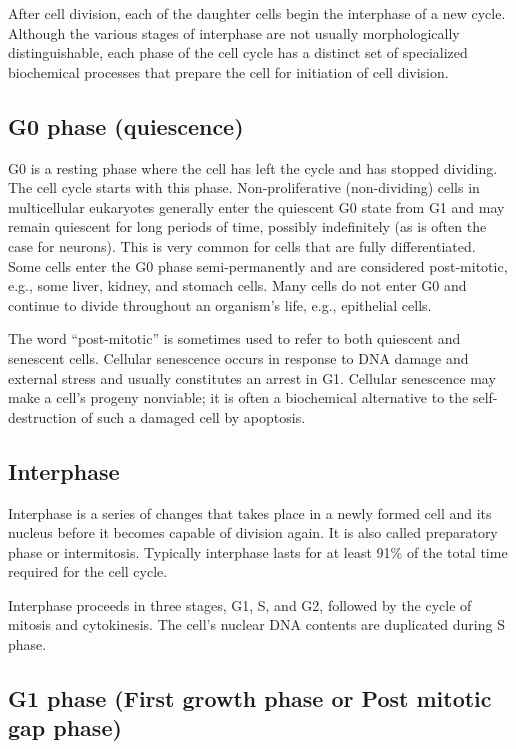 After cell division, each of the daughter cells begin the interphase of a new cycle. Although the various stages of interphase are not usually morphologically distinguishable, each phase of the cell cycle has a distinct set of specialized biochemical processes that prepare the cell for initiation of cell division.

\hypertarget{g0-phase-quiescence}{%
\subsection{G0 phase (quiescence)}\label{g0-phase-quiescence}}

G0 is a resting phase where the cell has left the cycle and has stopped dividing. The cell cycle starts with this phase. Non-proliferative (non-dividing) cells in multicellular eukaryotes generally enter the quiescent G0 state from G1 and may remain quiescent for long periods of time, possibly indefinitely (as is often the case for neurons). This is very common for cells that are fully differentiated. Some cells enter the G0 phase semi-permanently and are considered post-mitotic, e.g., some liver, kidney, and stomach cells. Many cells do not enter G0 and continue to divide throughout an organism's life, e.g., epithelial cells.

The word ``post-mitotic'' is sometimes used to refer to both quiescent and senescent cells. Cellular senescence occurs in response to DNA damage and external stress and usually constitutes an arrest in G1. Cellular senescence may make a cell's progeny nonviable; it is often a biochemical alternative to the self-destruction of such a damaged cell by apoptosis.

\hypertarget{interphase}{%
\subsection{Interphase}\label{interphase}}

Interphase is a series of changes that takes place in a newly formed cell and its nucleus before it becomes capable of division again. It is also called preparatory phase or intermitosis. Typically interphase lasts for at least 91\% of the total time required for the cell cycle.

Interphase proceeds in three stages, G1, S, and G2, followed by the cycle of mitosis and cytokinesis. The cell's nuclear DNA contents are duplicated during S phase.

\hypertarget{g1-phase-first-growth-phase-or-post-mitotic-gap-phase}{%
\subsection{G1 phase (First growth phase or Post mitotic gap phase)}\label{g1-phase-first-growth-phase-or-post-mitotic-gap-phase}}

